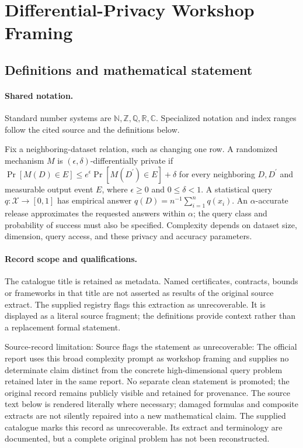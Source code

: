 \documentclass[11pt]{article}
\begin{document}
\section{Differential-Privacy Workshop Framing}\label{statement}

\subsection{Definitions and mathematical statement}

\paragraph{Shared notation.}Standard number systems are $\mathbb N,\mathbb Z,\mathbb Q,\mathbb R,\mathbb C$. Specialized notation and index ranges follow the cited source and the definitions below.


Fix a neighboring-dataset relation, such as changing one row. A randomized mechanism $M$ is $(\epsilon,\delta)$-differentially private if $\Pr[M(D)\in E]\le e^\epsilon\Pr[M(D^{\prime})\in E]+\delta$ for every neighboring $D,D^{\prime}$ and measurable output event $E$, where $\epsilon\ge0$ and $0\le\delta<1$. A statistical query $q:\mathcal X\to[0,1]$ has empirical answer $q(D)=n^{-1}\sum_{i=1}^n q(x_i)$. An $\alpha$-accurate release approximates the requested answers within $\alpha$; the query class and probability of success must also be specified. Complexity depends on dataset size, dimension, query access, and these privacy and accuracy parameters.
\paragraph{Record scope and qualifications.}
The catalogue title is retained as metadata. Named certificates, contracts, bounds or frameworks in that title are not asserted as results of the original source extract.
The supplied registry flags this extraction as unrecoverable. It is displayed as a literal source fragment; the definitions provide context rather than a replacement formal statement.

Source-record limitation: Source flags the statement as unrecoverable: The official report uses this broad complexity prompt as workshop framing and supplies no determinate claim distinct from the concrete high-dimensional query problem retained later in the same report. No separate clean statement is promoted; the original record remains publicly visible and retained for provenance.
The source text below is rendered literally where necessary; damaged formulas and composite extracts are not silently repaired into a new mathematical claim.
The supplied catalogue marks this record as unrecoverable. Its extract and terminology are documented, but a complete original problem has not been reconstructed.
\end{document}
